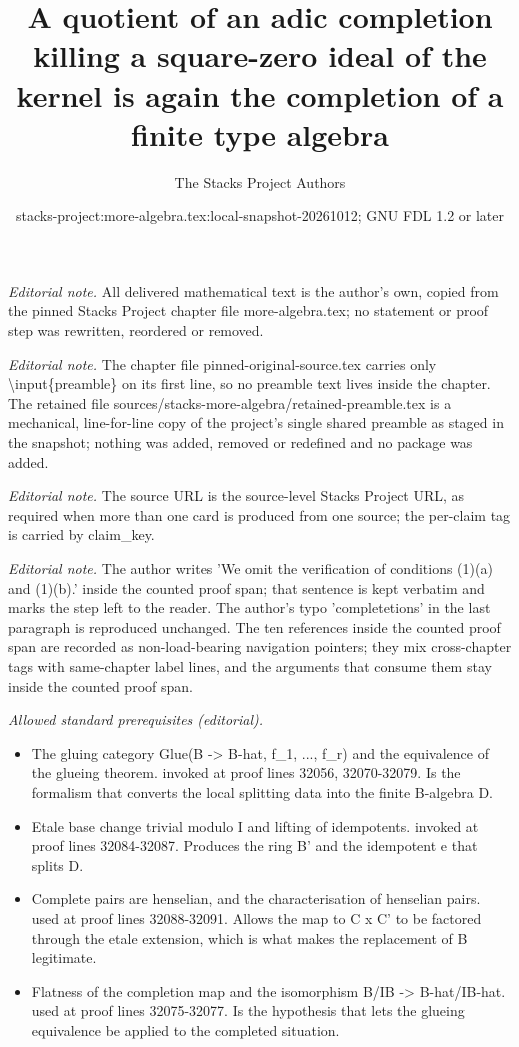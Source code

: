 \documentclass[10pt,a4paper]{amsart}
\title{A quotient of an adic completion killing a square-zero ideal of the kernel is again the completion of a finite type algebra}
\author{The Stacks Project Authors}
\date{stacks-project:more-algebra.tex:local-snapshot-20261012; GNU FDL 1.2 or later}
\theoremstyle{plain}
\theoremstyle{definition}
\theoremstyle{remark}
\numberwithin{equation}{subsection}
\begin{document}
\maketitle
\setcounter{subsection}{1}
\noindent\textit{Editorial note.} All delivered mathematical text is the author's own, copied from the pinned Stacks Project chapter file more-algebra.tex; no statement or proof step was rewritten, reordered or removed.\par\medskip
\noindent\textit{Editorial note.} The chapter file pinned-original-source.tex carries only \textbackslash{}input\{preamble\} on its first line, so no preamble text lives inside the chapter. The retained file sources/stacks-more-algebra/retained-preamble.tex is a mechanical, line-for-line copy of the project's single shared preamble as staged in the snapshot; nothing was added, removed or redefined and no package was added.\par\medskip
\noindent\textit{Editorial note.} The source URL is the source-level Stacks Project URL, as required when more than one card is produced from one source; the per-claim tag is carried by claim\_key.\par\medskip
\noindent\textit{Editorial note.} The author writes 'We omit the verification of conditions (1)(a) and (1)(b).' inside the counted proof span; that sentence is kept verbatim and marks the step left to the reader. The author's typo 'completetions' in the last paragraph is reproduced unchanged. The ten references inside the counted proof span are recorded as non-load-bearing navigation pointers; they mix cross-chapter tags with same-chapter label lines, and the arguments that consume them stay inside the counted proof span.\par\medskip
\noindent\textit{Allowed standard prerequisites (editorial).}\begin{itemize}
\item The gluing category Glue(B -> B-hat, f\_1, ..., f\_r) and the equivalence of the glueing theorem. invoked at proof lines 32056, 32070-32079. Is the formalism that converts the local splitting data into the finite B-algebra D.
\item Etale base change trivial modulo I and lifting of idempotents. invoked at proof lines 32084-32087. Produces the ring B' and the idempotent e that splits D.
\item Complete pairs are henselian, and the characterisation of henselian pairs. used at proof lines 32088-32091. Allows the map to C x C' to be factored through the etale extension, which is what makes the replacement of B legitimate.
\item Flatness of the completion map and the isomorphism B/IB -> B-hat/IB-hat. used at proof lines 32075-32077. Is the hypothesis that lets the glueing equivalence be applied to the completed situation.
\end{itemize}\medskip
\end{document}
